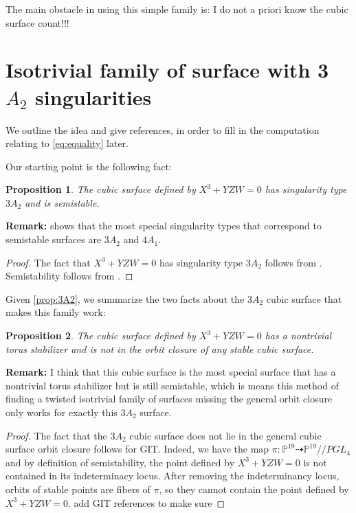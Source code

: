 \documentclass[12 pt]{amsart}
\newtheorem{proposition}{Proposition}[section]
\newenvironment{remark}{\textbf{Remark:}}{}
\newcommand{\<}{\left\langle}
\renewcommand{\>}{\right\rangle}
\begin{document}
The main obstacle in using this simple family is: I do not a priori
know the cubic surface count!!!

\section{Isotrivial family of surface with 3 $A_2$ singularities}
\label{sec:isotrivial3A2}

We outline the idea and give references, in order to fill in the computation relating to \eqref{eq:equality} later. 

Our starting point is the following fact:
\begin{proposition}
\label{prop:3A2}
The cubic surface defined by $X^3 + YZW = 0$ has singularity type $3A_2$ and is semistable.
\end{proposition}

\begin{remark}
\cite[Proposition 2.2]{N05} shows that the most special singularity types that correspond to semistable surfaces are $3A_2$ and $4A_1$. 
\end{remark}

\begin{proof}
The fact that $X^3 + YZW=0$ has singularity type $3A_2$ follows from \cite[Proof of 3.1.12]{N00}. Semistability follows from \cite[Proposition 2.3]{N05}.
\end{proof}

Given \autoref{prop:3A2}, we summarize the two facts about the $3A_2$ cubic surface that makes this family work:
\begin{proposition}
\label{prop:twofacts}
The cubic surface defined by $X^3 + YZW = 0$ has a nontrivial torus stabilizer and is not in the orbit closure of any stable cubic surface.
\end{proposition}

\begin{remark}
I think that this cubic surface is the most special surface that has a nontrivial torus stabilizer but is still semistable, which is means this method of finding a twisted isotrivial family of surfaces missing the general orbit closure only works for exactly this $3A_2$ surface. 
\end{remark}

\begin{proof}
The fact that the $3A_2$ cubic surface does not lie in the general cubic surface orbit closure follows for GIT. Indeed, we have the map $\pi: \mathbb{P}^{19}\dashrightarrow \mathbb{P}^{19}//PGL_4$ and by definition of semistability, the point defined by $X^3 + YZW = 0$ is not contained in its indeterminacy locus. After removing the indeterminancy locus, orbits of stable points are fibers of $\pi$, so they cannot contain the point defined by $X^3 + YZW = 0$. {\color{red} add GIT references to make sure}
\end{proof}
\end{document}
